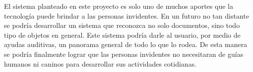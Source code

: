 \documentclass[a4paper, 11pt, oneside]{report}
\begin{document}
El sistema planteado en este proyecto es solo uno de muchos aportes que la tecnología puede brindar a las personas invidentes. En un futuro no tan distante se podría desarrollar un sistema que reconozca no solo documentos, sino todo tipo de objetos en general. Este sistema podría darle al usuario, por medio de ayudas auditivas, un panorama general de todo lo que lo rodea. De esta manera se podría finalmente lograr que las personas invidentes no necesitaran de guías humanos ni caninos para desarrollar sus actividades cotidianas.

\end{document}

